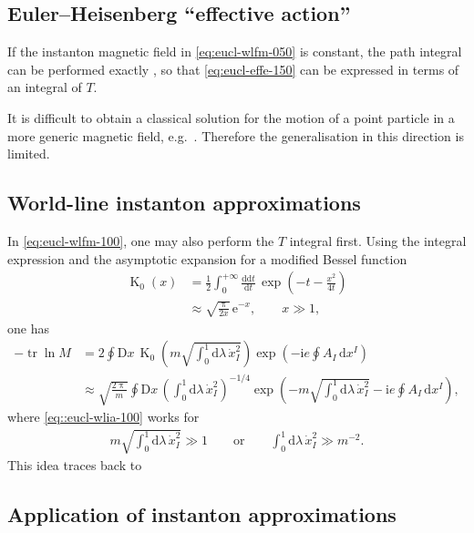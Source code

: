 \documentclass[12pt]{article}
\newcommand\mi{\mathrm{i}} %
\newcommand\me{\mathrm{e}} %
\newcommand\pp{\uppi}
\newcommand\dif{\mathrm{d}}
\newcommand\Dif{\mathrm{D}}
\DeclareMathOperator{\BesselK}{K}
\DeclareMathOperator{\tr}{tr}
\newcommand{\rbr}[1]{{\left(#1\right)}}
\newcommand{\rfun}[2]{{#1}\mathopen{}\left(#2\right)\mathclose{}}
\newcommand{\frde}[2]{{\frac{\dif{#1}}{\dif{#2}}}}
\begin{document}
\subsection{Euler--Heisenberg ``effective action''}
\label{ssec:eucl-ehel}

If the instanton magnetic field in \cref{eq:eucl-wlfm-050} is constant, the 
path integral can be performed exactly \cite{Feynman1965}, so that 
\cref{eq:eucl-effe-150} can be expressed in terms of an integral of $T$.

It is difficult to obtain a classical solution for the motion of a point 
particle in a more generic magnetic field, e.g.\ \cite{Kondo1964}. Therefore 
the generalisation in this direction is limited.

\subsection{World-line instanton approximations}
\label{ssec:eucl-wlia}

In \cref{eq:eucl-wlfm-100}, one may also perform the $T$ integral first. Using 
the integral expression and the asymptotic expansion for a modified Bessel 
function
\begin{align}
\rfun{\BesselK_0}{x} &= \frac{1}{2} \int_0^{+\infty} \frde{\dif t}{t}\,
	\rfun{\exp}{-t-\frac{x^2}{4t}}
\\
&\approx \sqrt{\frac{\pp}{2x}}\,\me^{-x},\qquad
	x \gg 1,
\end{align}
one has
\begin{align}
- \tr\ln M &= 2 \oint \Dif x\,
	\rfun{\BesselK_0}{m\sqrt{\int_0^1 \dif\lambda\, \dot{x}_I^2}}
		\rfun{\exp}{- \mi e \oint A_I\,\dif x^I}
\\
&\approx \sqrt{\frac{2\pp}{m}} \oint \Dif x\,
	\rbr{\int_0^1 \dif\lambda\, \dot{x}_I^2}^{-1/4}
	\rfun{\exp}{-m\sqrt{\int_0^1 \dif\lambda\, \dot{x}_I^2}
		- \mi e \oint A_I\,\dif x^I},
\label{eq::eucl-wlia-100}
\end{align}
where \cref{eq::eucl-wlia-100} works for
\begin{align}
m \sqrt{\int_0^1 \dif\lambda\, \dot{x}_I^2} \gg 1
\qquad\text{or}\qquad
\int_0^1 \dif\lambda\, \dot{x}_I^2 \gg m^{-2}.
\end{align}
This idea traces back to \cite{Affleck1982}


\subsection{Application of instanton approximations}
\end{document}
